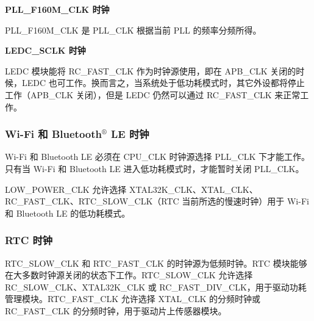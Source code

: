 \documentclass[main\_\_CN.tex]{subfiles}
\begin{document}
\textbf{PLL\_F160M\_CLK 时钟}

PLL\_F160M\_CLK 是 PLL\_CLK 根据当前 PLL 的频率分频所得。


\textbf{LEDC\_SCLK 时钟}

LEDC 模块能将 RC\_FAST\_CLK 作为时钟源使用，即在 APB\_CLK 关闭的时候，LEDC 也可工作。换而言之，当系统处于低功耗模式时，其它外设都将停止工作（APB\_CLK 关闭），但是 LEDC 仍然可以通过 RC\_FAST\_CLK 来正常工作。

\subsubsection{Wi-Fi 和 Bluetooth$^®$ LE 时钟}
Wi-Fi 和 Bluetooth LE 必须在 CPU\_CLK 时钟源选择 PLL\_CLK 下才能工作。只有当 Wi-Fi 和 Bluetooth LE 进入低功耗模式时，才能暂时关闭 PLL\_CLK。

LOW\_POWER\_CLK 允许选择 XTAL32K\_CLK、XTAL\_CLK、RC\_FAST\_CLK、RTC\_SLOW\_CLK（RTC 当前所选的慢速时钟）用于 Wi-Fi 和 Bluetooth LE 的低功耗模式。


\subsubsection{RTC 时钟}

RTC\_SLOW\_CLK 和 RTC\_FAST\_CLK 的时钟源为低频时钟。RTC 模块能够在大多数时钟源关闭的状态下工作。RTC\_SLOW\_CLK 允许选择 RC\_SLOW\_CLK、XTAL32K\_CLK 或 RC\_FAST\_DIV\_CLK，用于驱动功耗管理模块。RTC\_FAST\_CLK 允许选择 XTAL\_CLK 的分频时钟或 RC\_FAST\_CLK 的分频时钟，用于驱动片上传感器模块。
\end{document}
